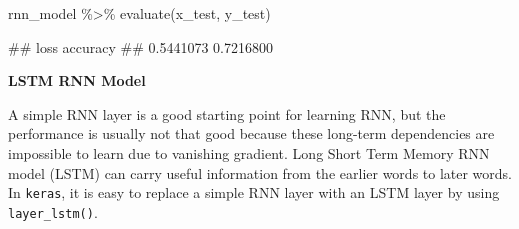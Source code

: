 \documentclass[
  12pt,
]{krantz}
\makeatletter
\newenvironment{Shaded}{\begin{snugshade}}{\end{snugshade}}
\newcommand{\FunctionTok}[1]{\textcolor[rgb]{0,0,0}{#1}}
\newcommand{\NormalTok}[1]{#1}
\newcommand{\SpecialCharTok}[1]{\textcolor[rgb]{0,0,0}{#1}}
\newenvironment{kframe}{%
\medskip{}
\setlength{\fboxsep}{.8em}
 \def\at@end@of@kframe{}%
 \ifinner\ifhmode%
  \def\at@end@of@kframe{\end{minipage}}%
  \begin{minipage}{\columnwidth}%
 \fi\fi%
 \def\FrameCommand##1{\hskip\@totalleftmargin \hskip-\fboxsep
 \colorbox{shadecolor}{##1}\hskip-\fboxsep
     \hskip-\linewidth \hskip-\@totalleftmargin \hskip\columnwidth}%
 \MakeFramed {\advance\hsize-\width
   \@totalleftmargin\z@ \linewidth\hsize
   \@setminipage}}%
 {\par\unskip\endMakeFramed%
 \at@end@of@kframe}
\renewenvironment{Shaded}{\begin{kframe}}{\end{kframe}}
\makeatother
\begin{document}
\begin{Shaded}
\begin{Highlighting}[]
\NormalTok{rnn\_model }\SpecialCharTok{\%\textgreater{}\%}
   \FunctionTok{evaluate}\NormalTok{(x\_test, y\_test)}
\end{Highlighting}
\end{Shaded}

\begin{Shaded}
\begin{Highlighting}[]
\NormalTok{\#\#      loss  accuracy }
\NormalTok{\#\# 0.5441073 0.7216800 }
\end{Highlighting}
\end{Shaded}

\textbf{LSTM RNN Model}

A simple RNN layer is a good starting point for learning RNN, but the performance is usually not that good because these long-term dependencies are impossible to learn due to vanishing gradient. Long Short Term Memory RNN model (LSTM) can carry useful information from the earlier words to later words. In \texttt{keras}, it is easy to replace a simple RNN layer with an LSTM layer by using \texttt{layer\_lstm()}.
\end{document}
